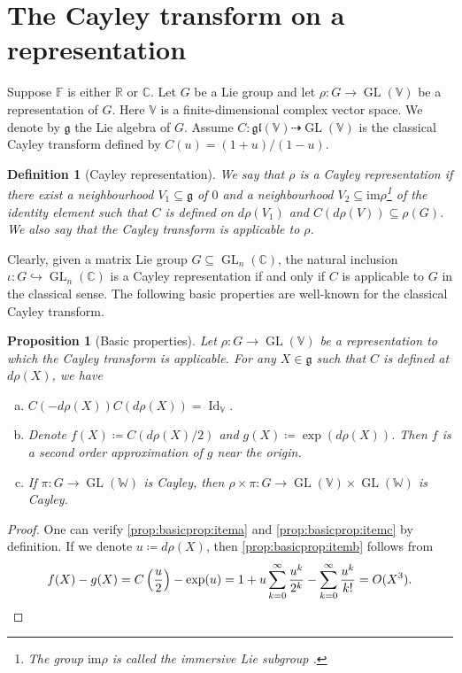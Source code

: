 \documentclass[11pt,reqno]{amsart}
\DeclareMathOperator{\GL}{GL}
\DeclareMathOperator{\Id}{Id}
\newtheorem{proposition}[theorem]{Proposition}
\newtheorem{definition}[theorem]{Definition}
\newcommand{\im}{\mathrm{im}} %
\newcommand{\CC}{\mathbb{C}} %
\begin{document}
\section{The Cayley transform on a representation}\label{sec:Cayley}
Suppose $\mathbb{F}$ is either $\mathbb{R}$ or $\mathbb{C}$.  Let $G$ be a Lie group and let $\rho: G \to   \GL(\mathbb{V})$ be a representation of $G$.  Here $\mathbb{V}$ is a finite-dimensional complex vector space. We denote by $\mathfrak{g}$ the Lie algebra of $G$. Assume $C: \mathfrak{gl}(\mathbb{V}) \dasharrow \GL(\mathbb{V})$ is the classical Cayley transform defined by $C(u) = (1 + u)/(1 - u)$.
\begin{definition}[Cayley representation]\label{def:Cayley representation}
We say that $\rho$ is a Cayley representation if there exist a neighbourhood $V_1\subseteq \mathfrak{g}$ of $0$ and a neighbourhood $V_2 \subseteq \im \rho$\footnote{The group $\im \rho$ is called the \emph{immersive Lie subgroup} \cite[Definition 4.2]{chenweihuan2001}.} of the identity element such that $C$ is defined on $d\rho (V_1)$ and $C(d\rho(V)) \subseteq \rho(G)$.  We also say that the Cayley transform is applicable to $\rho$.
\end{definition}
Clearly,  given a matrix Lie group $G \subseteq \GL_n(\mathbb{\CC})$,  the natural inclusion $\iota: G \hookrightarrow \GL_n(\mathbb{\CC})$ is a Cayley representation if and only if $C$ is applicable to $G$ in the classical sense.  The following basic properties are well-known for the classical Cayley transform.
\begin{proposition}[Basic properties]\label{prop:basicprop}
Let $\rho:  G \to \GL(\mathbb{V})$ be a representation to which the Cayley transform is applicable.  For any $X \in \mathfrak{g}$ such that $C$ is defined at $d\rho (X)$,  we have 
\begin{enumerate}[(a)]
\item $C(-d\rho(X)) C(d\rho(X)) = \Id_{\mathbb{V}}$.  \label{prop:basicprop:itema}
\item Denote $f(X) \coloneqq C ( d\rho (X)/2 )$ and $g(X) \coloneqq \exp (d\rho(X))$.  Then $f$ is a second order approximation of $g$ near the origin.  \label{prop:basicprop:itemb}
\item If $\pi: G \to  \GL(\mathbb{W})$ is Cayley,  then $\rho \times \pi: G \to \GL(\mathbb{V}) \times \GL(\mathbb{W})$ is Cayley. \label{prop:basicprop:itemc}
\end{enumerate}
\end{proposition}
\begin{proof}
One can verify \eqref{prop:basicprop:itema} and \eqref{prop:basicprop:itemc} by definition.  If we denote $u \coloneqq d\rho(X)$,  then \eqref{prop:basicprop:itemb} follows from
\[
f(X) - g(X) = C\left( \frac{u}{2} \right) - \exp(u) =  1 +u  \sum_{k=0}^{\infty}\frac{u^k}{2^k} - \sum_{k =0}^{\infty}\frac{u^k}{k!}= O(X^3).  \qedhere
\]
\end{proof}
\end{document}
